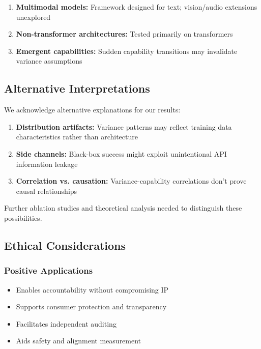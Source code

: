 \documentclass[11pt,a4paper]{article}
\begin{document}
\begin{enumerate}
\item \textbf{Multimodal models:} Framework designed for text; vision/audio extensions unexplored
\item \textbf{Non-transformer architectures:} Tested primarily on transformers
\item \textbf{Emergent capabilities:} Sudden capability transitions may invalidate variance assumptions
\end{enumerate}

\subsection{Alternative Interpretations}

We acknowledge alternative explanations for our results:

\begin{enumerate}
\item \textbf{Distribution artifacts:} Variance patterns may reflect training data characteristics rather than architecture
\item \textbf{Side channels:} Black-box success might exploit unintentional API information leakage
\item \textbf{Correlation vs. causation:} Variance-capability correlations don't prove causal relationships
\end{enumerate}

Further ablation studies and theoretical analysis needed to distinguish these possibilities.

\subsection{Ethical Considerations}

\subsubsection{Positive Applications}

\begin{itemize}
\item Enables accountability without compromising IP
\item Supports consumer protection and transparency
\item Facilitates independent auditing
\item Aids safety and alignment measurement
\end{itemize}
\end{document}
